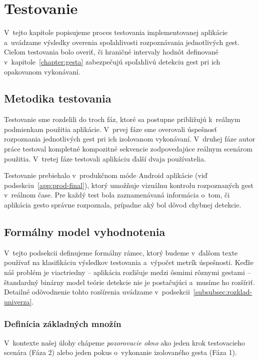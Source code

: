 \section{Testovanie}
\label{chapter:testovanie}

V~tejto kapitole popisujeme proces testovania
implementovanej aplikácie a~uvádzame výsledky
overenia spoľahlivosti rozpoznávania jednotlivých
gest. Cieľom testovania bolo overiť, či hraničné intervaly
hodnôt definované v~kapitole~\ref{chapter:gesta}
zabezpečujú spoľahlivú detekciu gest pri ich
opakovanom vykonávaní.

\subsection{Metodika testovania}

Testovanie sme rozdelili do troch fáz, ktoré sa
postupne približujú k~reálnym podmienkam použitia
aplikácie. V~prvej fáze sme overovali úspešnosť
rozpoznania jednotlivých gest pri ich izolovanom
vykonávaní. V~druhej fáze autor práce testoval kompletné
kompozitné sekvencie zodpovedajúce reálnym scenárom
použitia. V~tretej fáze testovali aplikáciu ďalší 
dvaja používatelia.

Testovanie prebiehalo v~produkčnom móde Android aplikácie
(viď podsekciu~\ref{app:prod-final}), ktorý umožňuje
vizuálnu kontrolu rozpoznaných gest v~reálnom čase.
Pre každý test bola zaznamenávaná informácia o~tom,
či aplikácia gesto správne rozpoznala, prípadne aký
bol dôvod chybnej detekcie.

\subsection{Formálny model vyhodnotenia}
\label{subsec:formalny-model}

V~tejto podsekcii definujeme formálny rámec, ktorý
budeme v~ďalšom texte používať na klasifikáciu
výsledkov testovania a~výpočet metrík úspešnosti.
Keďže náš problém je viactriedny -- aplikácia rozlišuje
medzi ôsmimi rôznymi gestami -- štandardný binárny
model teórie detekcie nie je postačujúci a~musíme ho
rozšíriť. Detailné odôvodnenie tohto rozšírenia
uvádzame v~podsekcii~\ref{subsubsec:rozklad-univerza}.

\subsubsection{Definícia základných množín}
V~kontexte našej úlohy chápeme \textit{pozorovacie okno}
ako jeden krok testovacieho scenára (Fáza 2) alebo jeden
pokus o~vykonanie izolovaného gesta (Fáza 1).

